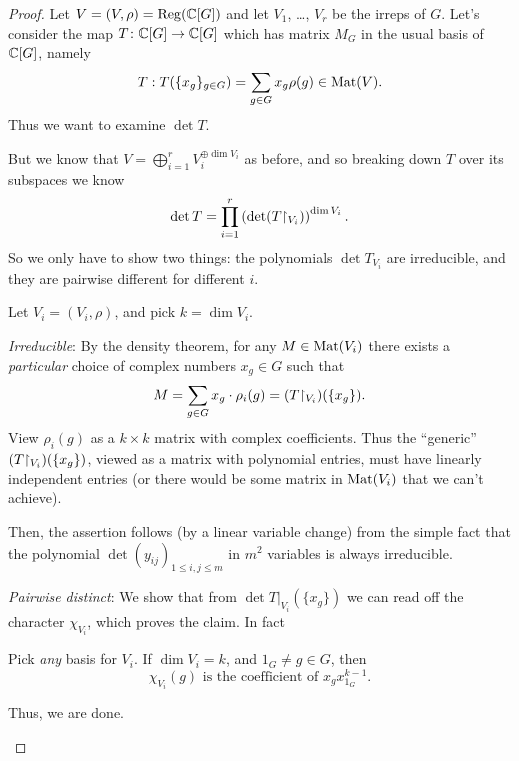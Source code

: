 \begin{proof}
	Let $V = (V, \rho) = \operatorname{Reg}(\mathbb C[G])$ and let $V_1$, \dots, $V_r$
	be the irreps of $G$.
	Let's consider the map $T \colon \mathbb C[G] \to \mathbb C[G]$
	which has matrix $M_G$ in the usual basis of $\mathbb C[G]$, namely
	\[ T : T(\{x_g\}_{g \in G}) = \sum_{g \in G} x_g \rho(g) \in \mathrm{Mat}(V). \]
	Thus we want to examine $\det T$.

	But we know that $V = \bigoplus_{i=1}^r V_i^{\oplus \dim V_i}$
	as before, and so breaking down $T$ over its subspaces we know
	\[
		\det T
		= \prod_{i=1}^r \left( \det (T \restrict{V_i})  \right)^{\dim V_i}.
	\]
	So we only have to show two things:
	the polynomials $\det T_{V_i}$ are irreducible,
	and they are pairwise different for different $i$.

	Let $V_i = (V_i, \rho)$, and pick $k = \dim V_i$.
	\begin{itemize}
		\ii \emph{Irreducible}:
		By the density theorem, for any $M \in \mathrm{Mat}(V_i)$ there exists
		a \emph{particular} choice of complex numbers $x_g \in G$ such that
		\[
			M = \sum_{g \in G} x_g
			\cdot \rho_i(g)
			= (T \restrict{V_i})(\{x_g\}).
		\]
		View $\rho_i(g)$ as a $k \times k$ matrix with complex coefficients.
		Thus the ``generic'' $(T \restrict{V_i})(\{x_g\})$, viewed as a matrix with
		polynomial entries, must have linearly independent entries
		(or there would be some matrix in $\mathrm{Mat}(V_i)$ that we can't achieve).

		Then, the assertion follows (by a linear variable change)
		from the simple fact that the polynomial
		$\det (y_{ij})_{1 \le i, j \le m}$ in $m^2$ variables
		is always irreducible.

		\ii \emph{Pairwise distinct}:
		We show that from $\det T|_{V_i}(\{x_g\})$ we can read
		off the character $\chi_{V_i}$, which proves the claim.
		In fact
		\begin{exercise}
			Pick \emph{any} basis for $V_i$.
			If $\dim V_i = k$, and $1_G \neq g \in G$, then
			\[
				\chi_{V_i} (g)
				\text{ is the coefficient of } x_g x_{1_G}^{k-1}.
			\]
		\end{exercise}
		Thus, we are done. \qedhere
	\end{itemize}
\end{proof}
